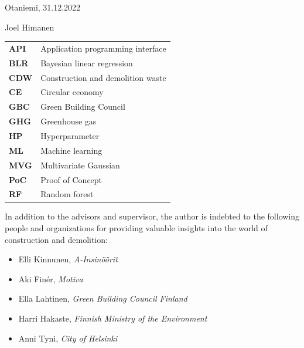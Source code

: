 \documentclass[english, 12pt, a4paper, sci, utf8, a-2b, online]{aaltothesis}
\begin{document}
\vspace{5cm}
Otaniemi, 31.12.2022

\vspace{5mm}
{\hfill Joel Himanen \hspace{1cm}}

\newpage


\thesistableofcontents




\begin{tabular}{ll}
  \textbf{API} & Application programming interface \\
  \textbf{BLR} & Bayesian linear regression        \\
  \textbf{CDW} & Construction and demolition waste \\
  \textbf{CE}  & Circular economy                  \\
  \textbf{GBC} & Green Building Council            \\
  \textbf{GHG} & Greenhouse gas                    \\
  \textbf{HP}  & Hyperparameter                    \\
  \textbf{ML}  & Machine learning                  \\
  \textbf{MVG} & Multivariate Gaussian             \\
  \textbf{PoC} & Proof of Concept                  \\
  \textbf{RF}  & Random forest                     \\
\end{tabular}

\cleardoublepage



In addition to the advisors and supervisor, the author is indebted to the following people and organizations for providing valuable insights into the world of construction and demolition:

\begin{itemize}
  \item Elli Kinnunen, \textit{A-Insinöörit}
  \item Aki Finér, \textit{Motiva}
  \item Ella Lahtinen, \textit{Green Building Council Finland}
  \item Harri Hakaste, \textit{Finnish Ministry of the Environment}
  \item Anni Tyni, \textit{City of Helsinki}
\end{itemize}
\end{document}
